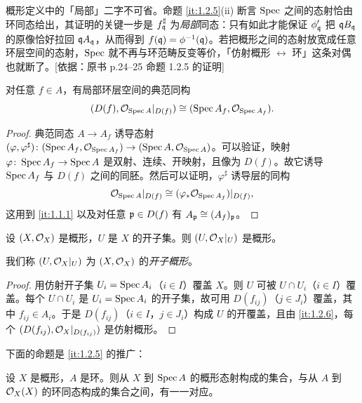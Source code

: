 \begin{tnote}
概形定义中的「局部」二字不可省。命题 \ref{it:1.2.5}(ii) 断言 $\operatorname{Spec}$ 之间的态射恰由环同态给出，其证明的关键一步是 $f^\sharp_{\mathfrak{q}}$ 为\emph{局部}同态：只有如此才能保证 $\phi'_{\mathfrak{q}}$ 把 $\mathfrak{q} B_{\mathfrak{q}}$ 的原像恰好拉回 $\mathfrak{q} A_{\mathfrak{q}}$，从而得到 $f(\mathfrak{q})=\phi^{-1}(\mathfrak{q})$。若把概形之间的态射放宽成任意环层空间的态射，$\operatorname{Spec}$ 就不再与环范畴反变等价，「仿射概形 $\leftrightarrow$ 环」这条对偶也就断了。[依据：原书 p.24–25 命题 1.2.5 的证明]
\end{tnote}

\begin{proposition}\label{it:1.2.6}
对任意 $f\in A$，有局部环层空间的典范同构
\[
(D(f),\mathcal{O}_{\operatorname{Spec} A}|_{D(f)})\cong(\operatorname{Spec} A_f,\mathcal{O}_{\operatorname{Spec} A_f}).
\]
\end{proposition}

\begin{proof}
典范同态 $A\to A_f$ 诱导态射 $(\varphi,\varphi^\sharp)\colon(\operatorname{Spec} A_f,\mathcal{O}_{\operatorname{Spec} A_f})\to(\operatorname{Spec} A,\mathcal{O}_{\operatorname{Spec} A})$。可以验证，映射 $\varphi\colon\operatorname{Spec} A_f\to\operatorname{Spec} A$ 是双射、连续、开映射，且像为 $D(f)$。故它诱导 $\operatorname{Spec} A_f$ 与 $D(f)$ 之间的同胚。然后可以证明，$\varphi^\sharp$ 诱导层的同构
\[
\mathcal{O}_{\operatorname{Spec} A}|_{D(f)}\cong(\varphi_*\mathcal{O}_{\operatorname{Spec} A_f})|_{D(f)},
\]
这用到 \ref{it:1.1.1} 以及对任意 $\mathfrak{p}\in D(f)$ 有 $A_{\mathfrak{p}}\cong(A_f)_{\mathfrak{p}}$。
\end{proof}

\begin{corollary}\label{it:1.2.7}
设 $(X,\mathcal{O}_X)$ 是概形，$U$ 是 $X$ 的开子集。则 $(U,\mathcal{O}_X|_U)$ 是概形。
\end{corollary}

我们称 $(U,\mathcal{O}_X|_U)$ 为 $(X,\mathcal{O}_X)$ 的\emph{开子概形}。

\begin{proof}
用仿射开子集 $U_i=\operatorname{Spec} A_i$（$i\in I$）覆盖 $X$。则 $U$ 可被 $U\cap U_i$（$i\in I$）覆盖。每个 $U\cap U_i$ 是 $U_i=\operatorname{Spec} A_i$ 的开子集，故可用 $D(f_{ij})$（$j\in J_i$）覆盖，其中 $f_{ij}\in A_i$。于是 $D(f_{ij})$（$i\in I$，$j\in J_i$）构成 $U$ 的开覆盖，且由 \ref{it:1.2.6}，每个 $(D(f_{ij}),\mathcal{O}_X|_{D(f_{ij})})$ 是仿射概形。
\end{proof}

下面的命题是 \ref{it:1.2.5} 的推广：

\begin{proposition}\label{it:1.2.8}
设 $X$ 是概形，$A$ 是环。则从 $X$ 到 $\operatorname{Spec} A$ 的概形态射构成的集合，与从 $A$ 到 $\mathcal{O}_X(X)$ 的环同态构成的集合之间，有一一对应。
\end{proposition}

